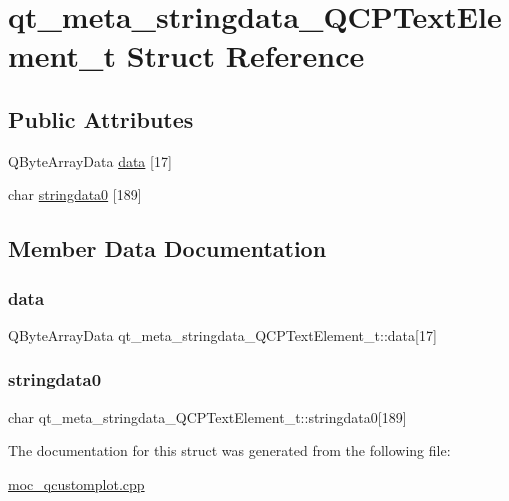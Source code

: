 \hypertarget{structqt__meta__stringdata__QCPTextElement__t}{}\section{qt\+\_\+meta\+\_\+stringdata\+\_\+\+Q\+C\+P\+Text\+Element\+\_\+t Struct Reference}
\label{structqt__meta__stringdata__QCPTextElement__t}
\subsection*{Public Attributes}
\begin{DoxyCompactItemize}
\item 
Q\+Byte\+Array\+Data \mbox{\hyperlink{structqt__meta__stringdata__QCPTextElement__t_aea7ed3e03af38c139400f8c837a108bf}{data}} \mbox{[}17\mbox{]}
\item 
char \mbox{\hyperlink{structqt__meta__stringdata__QCPTextElement__t_a7307363ad48472f7f131b7b59640d43b}{stringdata0}} \mbox{[}189\mbox{]}
\end{DoxyCompactItemize}


\subsection{Member Data Documentation}
\mbox{\label{structqt__meta__stringdata__QCPTextElement__t_aea7ed3e03af38c139400f8c837a108bf}} 
\subsubsection{\texorpdfstring{data}{data}}
{\footnotesize\ttfamily Q\+Byte\+Array\+Data qt\+\_\+meta\+\_\+stringdata\+\_\+\+Q\+C\+P\+Text\+Element\+\_\+t\+::data\mbox{[}17\mbox{]}}

\mbox{\label{structqt__meta__stringdata__QCPTextElement__t_a7307363ad48472f7f131b7b59640d43b}} 
\subsubsection{\texorpdfstring{stringdata0}{stringdata0}}
{\footnotesize\ttfamily char qt\+\_\+meta\+\_\+stringdata\+\_\+\+Q\+C\+P\+Text\+Element\+\_\+t\+::stringdata0\mbox{[}189\mbox{]}}



The documentation for this struct was generated from the following file\+:\begin{DoxyCompactItemize}
\item 
\mbox{\hyperlink{moc__qcustomplot_8cpp}{moc\+\_\+qcustomplot.\+cpp}}\end{DoxyCompactItemize}
